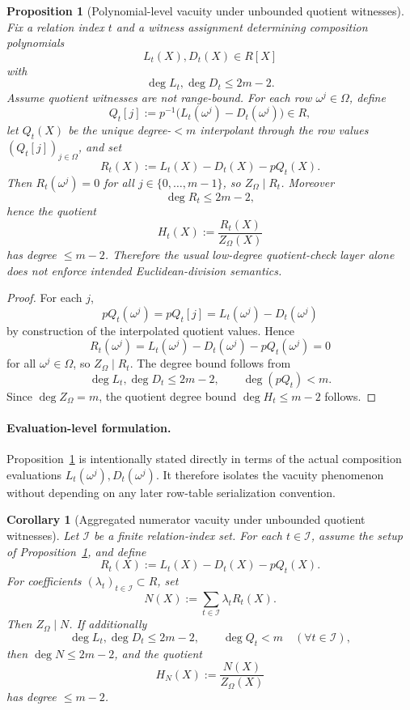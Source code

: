 ﻿\documentclass[11pt]{article}
\newtheorem{corollary}[theorem]{Corollary}
\newtheorem{proposition}[theorem]{Proposition}
\begin{document}
\begin{proposition}[Polynomial-level vacuity under unbounded quotient witnesses]
\label{prop:poly-level-vacuity}
Fix a relation index \(t\) and a witness assignment determining composition
polynomials
\[
L_t(X),D_t(X)\in R[X]
\]
with
\[
\deg L_t,\deg D_t \le 2m-2.
\]
Assume quotient witnesses are not range-bound. For each row \(\omega^j\in\Omega\),
define
\[
Q_t[j] := p^{-1}\bigl(L_t(\omega^j)-D_t(\omega^j)\bigr)\in R,
\]
let \(Q_t(X)\) be the unique degree-\(<m\) interpolant through the row values
\((Q_t[j])_{j\in\Omega}\), and set
\[
R_t(X):=L_t(X)-D_t(X)-pQ_t(X).
\]
Then \(R_t(\omega^j)=0\) for all \(j\in\{0,\dots,m-1\}\), so \(Z_\Omega\mid R_t\).
Moreover
\[
\deg R_t\le 2m-2,
\]
hence the quotient
\[
H_t(X):=\frac{R_t(X)}{Z_\Omega(X)}
\]
has degree \(\le m-2\). Therefore the usual low-degree quotient-check layer
alone does not enforce intended Euclidean-division semantics.
\end{proposition}

\begin{proof}
For each \(j\),
\[
pQ_t(\omega^j)=pQ_t[j]=L_t(\omega^j)-D_t(\omega^j)
\]
by construction of the interpolated quotient values. Hence
\[
R_t(\omega^j)=L_t(\omega^j)-D_t(\omega^j)-pQ_t(\omega^j)=0
\]
for all \(\omega^j\in\Omega\), so \(Z_\Omega\mid R_t\). The degree bound follows
from
\[
\deg L_t,\deg D_t\le 2m-2,\qquad \deg(pQ_t)<m.
\]
Since \(\deg Z_\Omega=m\), the quotient degree bound \(\deg H_t\le m-2\) follows.
\end{proof}

\paragraph{Evaluation-level formulation.}
Proposition~\ref{prop:poly-level-vacuity} is intentionally stated directly in
terms of the actual composition evaluations
\(L_t(\omega^j),D_t(\omega^j)\). It therefore isolates the vacuity phenomenon
without depending on any later row-table serialization convention.

\begin{corollary}[Aggregated numerator vacuity under unbounded quotient witnesses]
\label{cor:aggregated-vacuity}
Let \(\mathcal I\) be a finite relation-index set. For each \(t\in\mathcal I\),
assume the setup of Proposition~\ref{prop:poly-level-vacuity}, and define
\[
R_t(X):=L_t(X)-D_t(X)-pQ_t(X).
\]
For coefficients \((\lambda_t)_{t\in\mathcal I}\subset R\), set
\[
N(X):=\sum_{t\in\mathcal I}\lambda_t R_t(X).
\]
Then \(Z_\Omega\mid N\). If additionally
\[
\deg L_t,\deg D_t\le 2m-2,\qquad \deg Q_t<m \quad (\forall t\in\mathcal I),
\]
then \(\deg N\le 2m-2\), and the quotient
\[
H_N(X):=\frac{N(X)}{Z_\Omega(X)}
\]
has degree \(\le m-2\).
\end{corollary}
\end{document}
